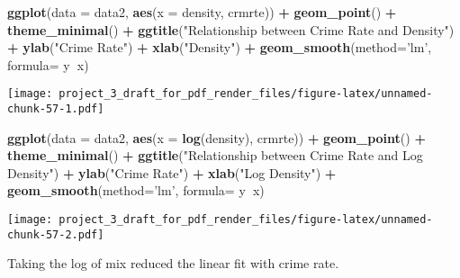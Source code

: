 \documentclass[]{article}
\newenvironment{Shaded}{\begin{snugshade}}{\end{snugshade}}
\newcommand{\DataTypeTok}[1]{\textcolor[rgb]{0.13,0.29,0.53}{#1}}
\newcommand{\KeywordTok}[1]{\textcolor[rgb]{0.13,0.29,0.53}{\textbf{#1}}}
\newcommand{\NormalTok}[1]{#1}
\newcommand{\OperatorTok}[1]{\textcolor[rgb]{0.81,0.36,0.00}{\textbf{#1}}}
\newcommand{\StringTok}[1]{\textcolor[rgb]{0.31,0.60,0.02}{#1}}
\begin{document}
\begin{Shaded}
\begin{Highlighting}[]
\KeywordTok{ggplot}\NormalTok{(}\DataTypeTok{data =}\NormalTok{ data2, }\KeywordTok{aes}\NormalTok{(}\DataTypeTok{x =}\NormalTok{ density, crmrte)) }\OperatorTok{+}
\StringTok{  }\KeywordTok{geom_point}\NormalTok{() }\OperatorTok{+}
\StringTok{  }\KeywordTok{theme_minimal}\NormalTok{() }\OperatorTok{+}
\StringTok{  }\KeywordTok{ggtitle}\NormalTok{(}\StringTok{"Relationship between Crime Rate and Density"}\NormalTok{) }\OperatorTok{+}\StringTok{ }
\StringTok{  }\KeywordTok{ylab}\NormalTok{(}\StringTok{"Crime Rate"}\NormalTok{) }\OperatorTok{+}\StringTok{ }\KeywordTok{xlab}\NormalTok{(}\StringTok{"Density"}\NormalTok{) }\OperatorTok{+}
\StringTok{  }\KeywordTok{geom_smooth}\NormalTok{(}\DataTypeTok{method=}\StringTok{'lm'}\NormalTok{, }\DataTypeTok{formula=}\NormalTok{ y}\OperatorTok{~}\NormalTok{x)}
\end{Highlighting}
\end{Shaded}

\texttt{[image: project\_3\_draft\_for\_pdf\_render\_files/figure-latex/unnamed-chunk-57-1.pdf]}

\begin{Shaded}
\begin{Highlighting}[]
\KeywordTok{ggplot}\NormalTok{(}\DataTypeTok{data =}\NormalTok{ data2, }\KeywordTok{aes}\NormalTok{(}\DataTypeTok{x =} \KeywordTok{log}\NormalTok{(density), crmrte)) }\OperatorTok{+}
\StringTok{  }\KeywordTok{geom_point}\NormalTok{() }\OperatorTok{+}
\StringTok{  }\KeywordTok{theme_minimal}\NormalTok{() }\OperatorTok{+}
\StringTok{  }\KeywordTok{ggtitle}\NormalTok{(}\StringTok{"Relationship between Crime Rate and Log Density"}\NormalTok{) }\OperatorTok{+}\StringTok{ }
\StringTok{  }\KeywordTok{ylab}\NormalTok{(}\StringTok{"Crime Rate"}\NormalTok{) }\OperatorTok{+}\StringTok{ }\KeywordTok{xlab}\NormalTok{(}\StringTok{"Log Density"}\NormalTok{) }\OperatorTok{+}
\StringTok{  }\KeywordTok{geom_smooth}\NormalTok{(}\DataTypeTok{method=}\StringTok{'lm'}\NormalTok{, }\DataTypeTok{formula=}\NormalTok{ y}\OperatorTok{~}\NormalTok{x)}
\end{Highlighting}
\end{Shaded}

\texttt{[image: project\_3\_draft\_for\_pdf\_render\_files/figure-latex/unnamed-chunk-57-2.pdf]}

Taking the log of mix reduced the linear fit with crime rate.
\end{document}
